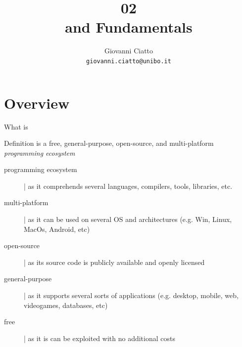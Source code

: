 \documentclass[presentation]{beamer}
\title[\lecturecode{02}]{02 \\ \dotnet and \csharp Fundamentals}
\author[Giovanni Ciatto]{Giovanni Ciatto\\\texttt{giovanni.ciatto@unibo.it}}
\begin{document}
\frame[label=coverpage]{\titlepage}

\section{\dotnet Overview}

\begin{frame}{What is \dotnet}
    \begin{block}{Definition}\centering
        \dotnet is a free, general-purpose, open-source, and multi-platform \emph{programming ecosystem}
    \end{block}  

    \vfill

    \begin{description}
        \item[programming ecosystem] | as it comprehends several languages, compilers, tools, libraries, etc.
        
        \vfill

        \item[multi-platform] | as it can be used on several OS and architectures (e.g. Win, Linux, MacOs, Android, etc)
        
        \vfill

        \item[open-source] | as its source code is publicly available and openly licensed
        
        \vfill

        \item[general-purpose] | as it supports several sorts of applications (e.g. desktop, mobile, web, videogames, databases, etc)
        
        \vfill

        \item[free] | as it is can be exploited with no additional costs
    \end{description}
\end{frame}
\end{document}
